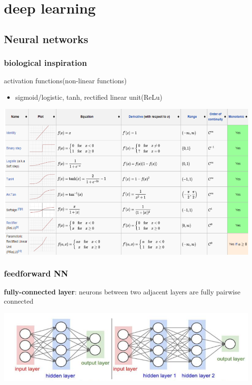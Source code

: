 \documentclass[11pt]{article}
\begin{document}
\section{deep learning}
\label{sec:orge6596d3}
\subsection{Neural networks}
\label{sec:org4399a57}
\subsubsection{biological inspiration}
\label{sec:org187934b}
activation functions(non-linear functions)
\begin{itemize}
\item sigmoid/logistic, tanh, rectified linear unit(ReLu)
\end{itemize}


\begin{center}
\includegraphics[width=.9\textwidth]{activation}
\end{center}

\subsubsection{feedforward NN}
\label{sec:orgd9ab4ac}
\textbf{fully-connected layer}: neurons between two adjacent layers are fully
pairwise connected
\begin{center}
\includegraphics[width=.9\textwidth]{FeedForwardNN}
\end{center}
\end{document}
